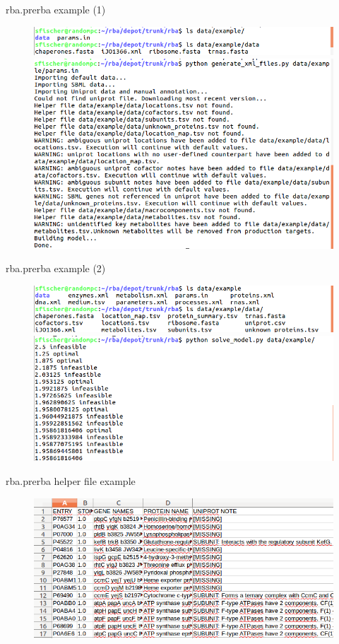 \documentclass{beamer}
\begin{document}
\begin{frame}{rba.prerba example (1)}
  \begin{figure}[!ht]
    \centering
    \includegraphics[width=0.8\linewidth]{example_1}

    \includegraphics[width=0.8\linewidth]{example_2}
  \end{figure}
\end{frame}

\begin{frame}{rba.prerba example (2)}
  \begin{figure}[!ht]
    \centering
    \includegraphics[width=0.8\linewidth]{example_3}

    \includegraphics[width=0.8\linewidth]{example_4}
  \end{figure}
\end{frame}

\begin{frame}{rba.prerba helper file example}
  \begin{figure}[!ht]
    \centering
    \includegraphics[width=\linewidth]{subunits_example}
  \end{figure}
\end{frame}
\end{document}
